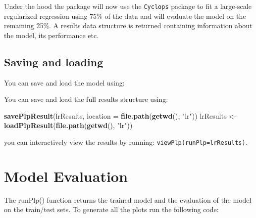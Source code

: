 \documentclass[]{article}
\newenvironment{Shaded}{\begin{snugshade}}{\end{snugshade}}
\newcommand{\KeywordTok}[1]{\textcolor[rgb]{0.13,0.29,0.53}{\textbf{#1}}}
\newcommand{\DataTypeTok}[1]{\textcolor[rgb]{0.13,0.29,0.53}{#1}}
\newcommand{\StringTok}[1]{\textcolor[rgb]{0.31,0.60,0.02}{#1}}
\newcommand{\OperatorTok}[1]{\textcolor[rgb]{0.81,0.36,0.00}{\textbf{#1}}}
\newcommand{\NormalTok}[1]{#1}
\begin{document}
Under the hood the package will now use the \texttt{Cyclops} package to
fit a large-scale regularized regression using 75\% of the data and will
evaluate the model on the remaining 25\%. A results data structure is
returned containing information about the model, its performance etc.

\newpage

\subsection{Saving and loading}\label{saving-and-loading}

You can save and load the model using:

\begin{Shaded}
\end{Shaded}

You can save and load the full results structure using:

\begin{Shaded}
\begin{Highlighting}[]
\KeywordTok{savePlpResult}\NormalTok{(lrResults, }\DataTypeTok{location =} \KeywordTok{file.path}\NormalTok{(}\KeywordTok{getwd}\NormalTok{(), }\StringTok{"lr"}\NormalTok{))}
\NormalTok{lrResults <-}\StringTok{ }\KeywordTok{loadPlpResult}\NormalTok{(}\KeywordTok{file.path}\NormalTok{(}\KeywordTok{getwd}\NormalTok{(), }\StringTok{"lr"}\NormalTok{))}
\end{Highlighting}
\end{Shaded}

you can interactively view the results by running:
\texttt{viewPlp(runPlp=lrResults)}. \newpage

\section{Model Evaluation}\label{model-evaluation}

The runPlp() function returns the trained model and the evaluation of
the model on the train/test sets. To generate all the plots run the
following code:
\end{document}
